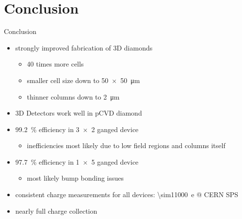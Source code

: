 \section{Conclusion}
\begin{frame}{Conclusion}

	\begin{minipage}[c][6cm]{\textwidth}
		\begin{itemize}\itemfill
			\item strongly improved fabrication of 3D diamonds
			\begin{itemize}
				\item 40 times more cells
				\item smaller cell size down to \SI{50x50}{\micro\meter}
				\item thinner columns down to \SI{2}{\micro\meter}\vspace*{2ex}
			\end{itemize}
			\item 3D Detectors work well in pCVD diamond
			\item \SI{99.2}{\%} efficiency in \SI{3x2}{} ganged device
			\begin{itemize}
				\item inefficiencies most likely due to low field regions and columns itself\vspace*{2ex}
			\end{itemize}
			\item \SI{97.7}{\%} efficiency in \SI{1x5}{} ganged device
			\begin{itemize}
				\item most likely bump bonding issues\vspace*{2ex}
			\end{itemize}
			\item consistent charge measurements for all devices: \SI{\sim11000}{e} @ CERN SPS
			\item nearly full charge collection
		\end{itemize}
	\end{minipage}
	
\end{frame}
